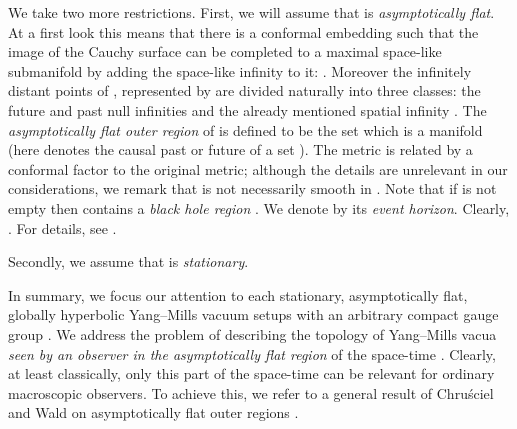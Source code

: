 \documentclass[a4paper,12pt,draft]{article}
\begin{document}
We take two more restrictions. First, we will assume that \coordHE{} is {\it
asymptotically flat}. At a first look this means that there is
a conformal embedding \coordHE{}
such that the image of the Cauchy surface can be
completed to a maximal space-like submanifold \coordHE{} by adding
the space-like infinity \coordHE{} to it: \coordHE{}. Moreover
the infinitely distant points of \coordHE{}, represented by \coordHE{} are
divided naturally into three classes: the future and past null infinities
\coordHE{} and the already mentioned spatial infinity \coordHE{}. The {\it
asymptotically flat outer region} of \coordHE{} is defined to be the set
\coordHE{} which is a manifold (here \coordHE{}
denotes the causal past or future of a set \coordHE{}). The 
metric \coordHE{} is related by a conformal factor \myHighlight{$\Omega$}\coordHE{} to
the original metric; although the details are unrelevant in our 
considerations, we remark that \coordHE{} is not necessarily smooth
in \coordHE{}. Note that if \coordHE{} is not empty then \coordHE{}
contains a {\it black hole region \coordHE{}}. We denote by \coordHE{}
its {\it event horizon}. Clearly, \coordHE{}. For
details, see \cite{wal}.

Secondly, we assume that \coordHE{} is {\it stationary}.

In summary, we focus our attention to each stationary, asymptotically 
flat, globally hyperbolic Yang--Mills vacuum setups \coordHE{} with an arbitrary compact gauge group \coordHE{}. We address the problem of
describing the topology of Yang--Mills vacua {\it seen by an observer in
the asymptotically flat region} of the space-time \coordHE{}. Clearly, at
least classically, only this part of the space-time can be relevant for
ordinary macroscopic observers. To achieve this, we refer to a general 
result of Chru\'sciel and Wald on asymptotically flat outer regions
\cite{chr-wal}.
\vspace{0.1in}
\end{document}
